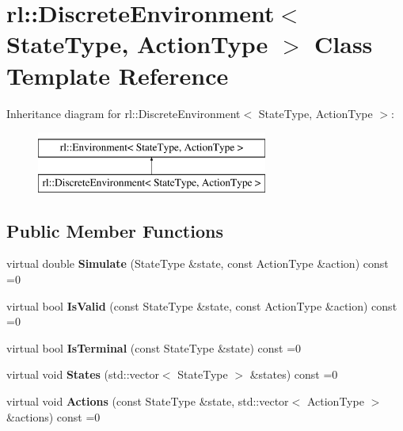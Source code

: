\hypertarget{classrl_1_1_discrete_environment}{}\section{rl\+:\+:Discrete\+Environment$<$ State\+Type, Action\+Type $>$ Class Template Reference}
\label{classrl_1_1_discrete_environment}
Inheritance diagram for rl\+:\+:Discrete\+Environment$<$ State\+Type, Action\+Type $>$\+:\begin{figure}[H]
\begin{center}
\leavevmode
\includegraphics[height=2.000000cm]{classrl_1_1_discrete_environment}
\end{center}
\end{figure}
\subsection*{Public Member Functions}
\begin{DoxyCompactItemize}
\item 
\hypertarget{classrl_1_1_discrete_environment_a98f98b36d1a5148175e4307bba402f5e}{}\label{classrl_1_1_discrete_environment_a98f98b36d1a5148175e4307bba402f5e} 
virtual double {\bfseries Simulate} (State\+Type \&state, const Action\+Type \&action) const =0
\item 
\hypertarget{classrl_1_1_discrete_environment_a4e5f5e0425dc93dea82734b7327b22b8}{}\label{classrl_1_1_discrete_environment_a4e5f5e0425dc93dea82734b7327b22b8} 
virtual bool {\bfseries Is\+Valid} (const State\+Type \&state, const Action\+Type \&action) const =0
\item 
\hypertarget{classrl_1_1_discrete_environment_a7f41635b8c010b8a18a8661d0c2c0932}{}\label{classrl_1_1_discrete_environment_a7f41635b8c010b8a18a8661d0c2c0932} 
virtual bool {\bfseries Is\+Terminal} (const State\+Type \&state) const =0
\item 
\hypertarget{classrl_1_1_discrete_environment_a2cd36d24262dfc595574708f1118760f}{}\label{classrl_1_1_discrete_environment_a2cd36d24262dfc595574708f1118760f} 
virtual void {\bfseries States} (std\+::vector$<$ State\+Type $>$ \&states) const =0
\item 
\hypertarget{classrl_1_1_discrete_environment_a46561149e83e67db9e83d6d6169a9087}{}\label{classrl_1_1_discrete_environment_a46561149e83e67db9e83d6d6169a9087} 
virtual void {\bfseries Actions} (const State\+Type \&state, std\+::vector$<$ Action\+Type $>$ \&actions) const =0
\end{DoxyCompactItemize}


